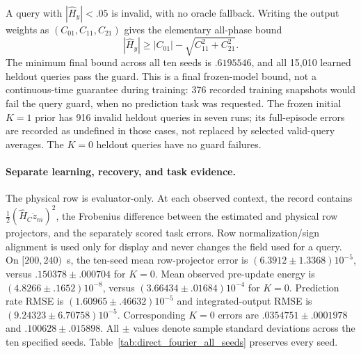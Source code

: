 \documentclass[journal]{IEEEtran}
\begin{document}
A query with $|\widehat H_y|<.05$ is invalid, with no oracle fallback.
Writing the output weights as $(C_{01},C_{11},C_{21})$ gives the elementary
all-phase bound
\begin{equation}
 |\widehat H_y|\ge |C_{01}|-\sqrt{C_{11}^2+C_{21}^2}.
 \label{eq:df_guard}
\end{equation}
The minimum final bound across all ten seeds is $.6195546$, and all 15,010
learned heldout queries pass the guard. This is a final frozen-model bound,
not a continuous-time guarantee during training: 376 recorded training
snapshots would fail the query guard, when no prediction task was requested.
The frozen initial $K=1$ prior has 916 invalid heldout queries in seven runs;
its full-episode errors are recorded as undefined in those cases, not
replaced by selected valid-query averages. The $K=0$ heldout queries have
no guard failures.

\paragraph{Separate learning, recovery, and task evidence.}
The physical row is evaluator-only. At each observed context, the record
contains $\tfrac12(\widehat H_C\dot z_m)^2$, the Frobenius difference between
the estimated and physical row projectors, and the separately scored task
errors. Row normalization/sign alignment is used only for display and never
changes the field used for a query. On $[200,240)$~s, the ten-seed mean
row-projector error is $(6.3912\pm1.3368)10^{-5}$, versus
$.150378\pm.000704$ for $K=0$. Mean observed pre-update energy is
$(4.8266\pm.1652)10^{-8}$, versus
$(3.66434\pm.01684)10^{-4}$ for $K=0$.
Prediction rate RMSE is $(1.60965\pm.46632)10^{-5}$ and integrated-output
RMSE is $(9.24323\pm6.70758)10^{-5}$. Corresponding $K=0$ errors are
$.0354751\pm.0001978$ and $.100628\pm.015898$.
All $\pm$ values denote sample standard deviations across the ten specified
seeds. Table~\ref{tab:direct_fourier_all_seeds} preserves every seed.
\end{document}
